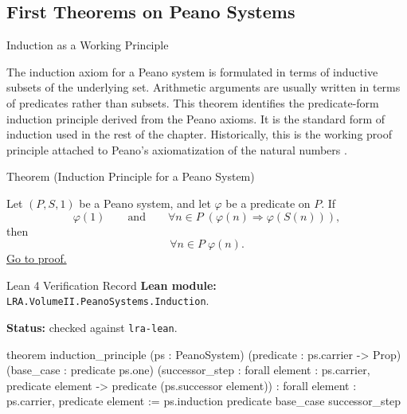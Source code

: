 \subsection*{First Theorems on Peano Systems}

\begin{topicbox}{Induction as a Working Principle}
\begin{exposition}
The induction axiom for a Peano system is formulated in terms of inductive
subsets of the underlying set. Arithmetic arguments are usually written in
terms of predicates rather than subsets. This theorem identifies the
predicate-form induction principle derived from the Peano axioms. It is the
standard form of induction used in the rest of the chapter. Historically,
this is the working proof principle attached to Peano's axiomatization of the
natural numbers \citep{PeanoArithmeticesPrincipia1889}.
\end{exposition}

\begin{theorembox}{Theorem (Induction Principle for a Peano System)}
\begin{theorem}
\label{thm:induction-principle-for-peano-system}
Let $(P,S,1)$ be a Peano system, and let $\varphi$ be a predicate on $P$.
If
\[
\varphi(1)
\qquad\text{and}\qquad
\forall n \in P\;(\varphi(n) \Longrightarrow \varphi(S(n))),
\]
then
\[
\forall n \in P\;\varphi(n).
\]
\hyperref[prf:induction-principle-for-peano-system]{Go to proof.}
\end{theorem}
\end{theorembox}

\begin{formalizationrecord}{Lean 4 Verification Record}
\textbf{Lean module:} \texttt{LRA.VolumeII.PeanoSystems.Induction}.\par
{}
\textbf{Status:} checked against \texttt{lra-lean}.\par

\begin{leancode}
theorem induction_principle
    (ps : PeanoSystem)
    (predicate : ps.carrier -> Prop)
    (base_case : predicate ps.one)
    (successor_step :
      forall element : ps.carrier,
        predicate element ->
        predicate (ps.successor element)) :
    forall element : ps.carrier,
      predicate element :=
  ps.induction predicate base_case successor_step
\end{leancode}
\end{formalizationrecord}


\end{topicbox}
